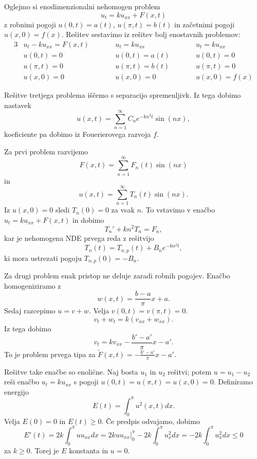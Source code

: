 
Oglejmo si enodimenzionalni nehomogen problem
\[
  u_t = k u_{xx} + F(x,t)
\]
z robnimi pogoji $u(0,t) = a(t)$, $u(\pi, t) = b(t)$ in začetnimi pogoji $u(x,0)
= f(x)$.
Rešitev sestavimo iz rešitev bolj enostavnih problemov:
\begin{alignat*}{3}
  & u_t - k u_{xx} = F(x,t) & \qquad & u_t = k u_{xx} & \qquad & u_t = k u_{xx} \\
  & u(0,t) = 0 & & u(0,t) = a(t) & & u(0,t) = 0 \\
  & u(\pi,t) = 0 & & u(\pi, t) = b(t) & & u(\pi, t) = 0 \\
  & u(x,0) = 0 & & u(x,0) = 0 & & u(x,0) = f(x)
\end{alignat*}

Rešitve tretjega problema iščemo s separacijo spremenljivk.
Iz tega dobimo nastavek
\[
  u(x,t) = \sum_{n=1}^\infty C_n e^{-k n^2 t} \sin(nx),
\]
koeficiente pa dobimo iz Fouerierovega razvoja $f$.

Za prvi problem razvijemo
\[
  F(x,t) = \sum_{n=1}^\infty F_n(t) \sin(nx)
\]
in
\[
  u(x,t) = \sum_{n=1}^\infty T_n(t) \sin(nx).
\]
Iz $u(x,0) = 0$ sledi $T_n(0) = 0$ za vsak $n$.
To vstavimo v enačbo $u_t = k u_{xx} + F(x,t)$ in dobimo
\[
  T_n' + k n^2 T_n = F_n,
\]
kar je nehomogena NDE prvega reda z rešitvijo
\[
  T_n(t) = T_{n,p}(t) + B_n e^{- k n^2 t},
\]
ki mora ustrezati pogoju $T_{n,p}(0) = -B_n$.

Za drugi problem enak pristop ne deluje zaradi robnih pogojev.
Enačbo homogeniziramo z
\[
  w(x,t) = \frac{b-a}{\pi} x + a.
\]
Sedaj razcepimo $u = v + w$.
Velja $v(0,t) = v(\pi, t) = 0$.
\[
  v_t + w_t = k (v_{xx} + w_{xx}).
\]
Iz tega dobimo
\[
  v_t = k v_{xx} - \frac{b'-a'}{\pi} x - a'.
\]
To je problem prvega tipa za $\tilde{F}(x,t) = - \frac{b'-a'}{\pi} x - a'$.


Rešitve take enačbe so enolične.
Naj bosta $u_1$ in $u_2$ rešitvi; potem $u = u_1 - u_2$ reši enačbo
$u_t = k u_{xx}$ s pogoji $u(0,t) = u(\pi, t) = u(x,0) = 0$.
Definiramo energijo
\[
  E(t) = \int_0^\pi u^2(x,t) dx.
\]
Velja $E(0) = 0$ in $E(t) \ge 0$.
Če predpis odvajamo, dobimo
\[
  E'(t) = 2k \int_0^\pi u u_{xx} dx
  = \left. 2 k u u_{xx} \right|_0^\pi - 2k \int_0^\pi u_x^2 dx
  = -2k \int_0^\pi u_x^2 dx
  \le 0
\]
za $k \ge 0$.
Torej je $E$ konstanta in $u = 0$.

